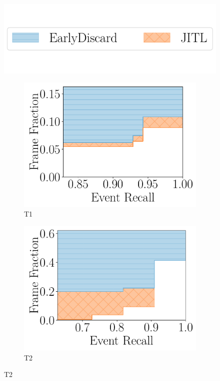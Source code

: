 \begin{figure}
    \centering
    \includegraphics[trim={0 1.8cm 0 0},clip,width=0.7\linewidth]{FIGS/fig-jitl-legend.pdf}\\
    \vspace{.5in}
    \begin{subfigure}[b]{.48\linewidth}
        \centering
        \includegraphics[width=\linewidth]{FIGS/fig-jitl-okutama-eventrecall-step.pdf}
        \caption{T1}
    \end{subfigure}
    \begin{subfigure}[b]{.48\linewidth}
        \centering
        \includegraphics[width=\linewidth]{FIGS/fig-jitl-stanford-eventrecall-step.pdf}
        \caption{T2}
    \end{subfigure}


\end{figure}
